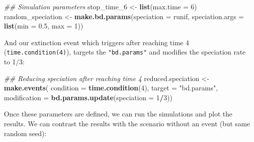 \documentclass[
]{book}
\newenvironment{Shaded}{\begin{snugshade}}{\end{snugshade}}
\newcommand{\CommentTok}[1]{\textcolor[rgb]{0.56,0.35,0.01}{\textit{#1}}}
\newcommand{\DataTypeTok}[1]{\textcolor[rgb]{0.13,0.29,0.53}{#1}}
\newcommand{\DecValTok}[1]{\textcolor[rgb]{0.00,0.00,0.81}{#1}}
\newcommand{\FloatTok}[1]{\textcolor[rgb]{0.00,0.00,0.81}{#1}}
\newcommand{\KeywordTok}[1]{\textcolor[rgb]{0.13,0.29,0.53}{\textbf{#1}}}
\newcommand{\NormalTok}[1]{#1}
\newcommand{\OperatorTok}[1]{\textcolor[rgb]{0.81,0.36,0.00}{\textbf{#1}}}
\newcommand{\StringTok}[1]{\textcolor[rgb]{0.31,0.60,0.02}{#1}}
\begin{document}
\begin{Shaded}
\begin{Highlighting}[]
\CommentTok{\#\# Simulation parameters}
\NormalTok{stop\_time\_}\DecValTok{6}\NormalTok{ \textless{}{-}}\StringTok{ }\KeywordTok{list}\NormalTok{(}\DataTypeTok{max.time =} \DecValTok{6}\NormalTok{)}
\NormalTok{random\_speciation \textless{}{-}}\StringTok{ }\KeywordTok{make.bd.params}\NormalTok{(}\DataTypeTok{speciation =}\NormalTok{ runif, }
                                    \DataTypeTok{speciation.args =} \KeywordTok{list}\NormalTok{(}\DataTypeTok{min =} \FloatTok{0.5}\NormalTok{, }\DataTypeTok{max =} \DecValTok{1}\NormalTok{))}
\end{Highlighting}
\end{Shaded}

And our extinction event which triggers after reaching time 4 (\texttt{time.condition(4)}), targets the \texttt{"bd.params"} and modifies the speciation rate to 1/3:

\begin{Shaded}
\begin{Highlighting}[]
\CommentTok{\#\# Reducing speciation after reaching time 4}
\NormalTok{reduced.speciation \textless{}{-}}\StringTok{ }\KeywordTok{make.events}\NormalTok{(}
                      \DataTypeTok{condition =} \KeywordTok{time.condition}\NormalTok{(}\DecValTok{4}\NormalTok{),}
                      \DataTypeTok{target =} \StringTok{"bd.params"}\NormalTok{,}
                      \DataTypeTok{modification =} \KeywordTok{bd.params.update}\NormalTok{(}\DataTypeTok{speciation =} \DecValTok{1}\OperatorTok{/}\DecValTok{3}\NormalTok{))}
\end{Highlighting}
\end{Shaded}

Once these parameters are defined, we can run the simulations and plot the results.
We can contrast the results with the scenario without an event (but same random seed):
\end{document}
